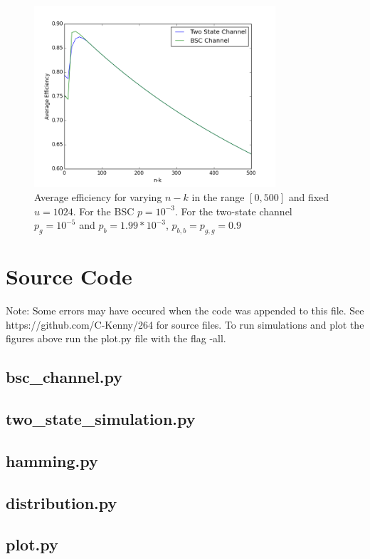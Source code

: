 \documentclass{article}
\begin{document}
\begin{figure}[H]
    \centering
    \includegraphics[width=0.8\textwidth]{q5.png}
    \caption{Average efficiency for varying $n-k$ in the range $[0, 500]$ and fixed $u=1024$. For the BSC $p=10^{-3}$.
            For the two-state channel $p_{g} = 10^{-5}$ and $p_b = 1.99*10^{-3}$, $p_{b,b} = p_{g,g} = 0.9$}
    \label{fig:awesome_image}
\end{figure}

\section*{Source Code}

Note: Some errors may have occured when the code was appended to this file. See https://github.com/C-Kenny/264
for source files. To run simulations and plot the figures above run the plot.py file with
the flag -all.

\subsection*{bsc\_channel.py}



\subsection*{two\_state\_simulation.py}



        \subsection*{hamming.py}

        

        \subsection*{distribution.py}

        

        \subsection*{plot.py}

        
\end{document}
